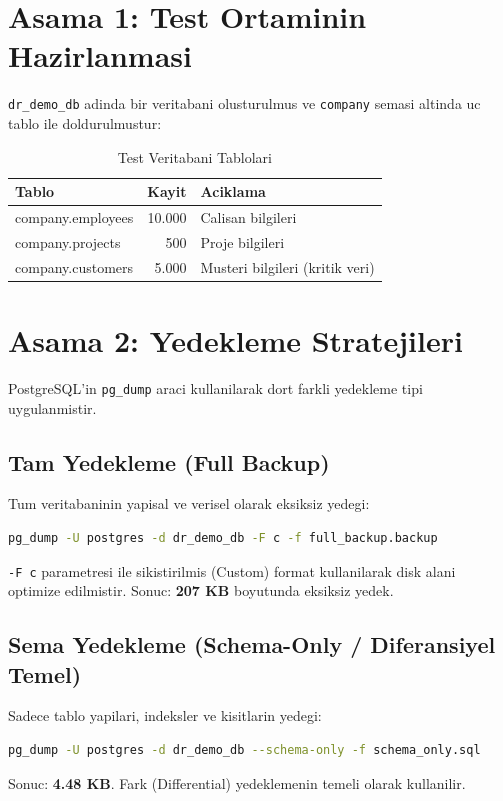 \documentclass[12pt,a4paper]{article}
\begin{document}
\section{Asama 1: Test Ortaminin Hazirlanmasi}
\texttt{dr\_demo\_db} adinda bir veritabani olusturulmus ve \texttt{company} semasi altinda uc tablo ile doldurulmustur:

\begin{table}[h]
\centering
\begin{tabular}{|l|r|l|}
\hline
\textbf{Tablo} & \textbf{Kayit} & \textbf{Aciklama} \\
\hline
company.employees & 10.000 & Calisan bilgileri \\
company.projects & 500 & Proje bilgileri \\
company.customers & 5.000 & Musteri bilgileri (kritik veri) \\
\hline
\end{tabular}
\caption{Test Veritabani Tablolari}
\end{table}

\section{Asama 2: Yedekleme Stratejileri}
PostgreSQL'in \texttt{pg\_dump} araci kullanilarak dort farkli yedekleme tipi uygulanmistir.

\subsection{Tam Yedekleme (Full Backup)}
Tum veritabaninin yapisal ve verisel olarak eksiksiz yedegi:
\begin{lstlisting}[language=bash, caption=Tam Yedekleme Komutu]
pg_dump -U postgres -d dr_demo_db -F c -f full_backup.backup
\end{lstlisting}
\texttt{-F c} parametresi ile sikistirilmis (Custom) format kullanilarak disk alani optimize edilmistir. Sonuc: \textbf{207 KB} boyutunda eksiksiz yedek.

\subsection{Sema Yedekleme (Schema-Only / Diferansiyel Temel)}
Sadece tablo yapilari, indeksler ve kisitlarin yedegi:
\begin{lstlisting}[language=bash, caption=Sema Yedekleme]
pg_dump -U postgres -d dr_demo_db --schema-only -f schema_only.sql
\end{lstlisting}
Sonuc: \textbf{4.48 KB}. Fark (Differential) yedeklemenin temeli olarak kullanilir.
\end{document}
